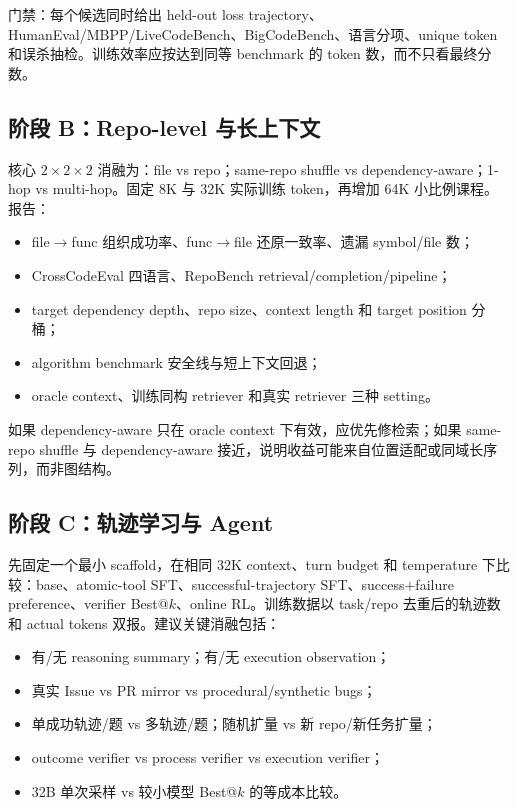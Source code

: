 \documentclass[10pt,a4paper,UTF8,fontset=none]{ctexart}
\begin{document}
门禁：每个候选同时给出 held-out loss trajectory、HumanEval/MBPP/LiveCodeBench、BigCodeBench、语言分项、unique token 和误杀抽检。训练效率应按达到同等 benchmark 的 token 数，而不只看最终分数。

\subsection{阶段 B：Repo-level 与长上下文}

核心 $2\times 2\times 2$ 消融为：file vs repo；same-repo shuffle vs dependency-aware；1-hop vs multi-hop。固定 8K 与 32K 实际训练 token，再增加 64K 小比例课程。报告：

\begin{itemize}
  \item file$\rightarrow$func 组织成功率、func$\rightarrow$file 还原一致率、遗漏 symbol/file 数；
  \item CrossCodeEval 四语言、RepoBench retrieval/completion/pipeline；
  \item target dependency depth、repo size、context length 和 target position 分桶；
  \item algorithm benchmark 安全线与短上下文回退；
  \item oracle context、训练同构 retriever 和真实 retriever 三种 setting。
\end{itemize}

如果 dependency-aware 只在 oracle context 下有效，应优先修检索；如果 same-repo shuffle 与 dependency-aware 接近，说明收益可能来自位置适配或同域长序列，而非图结构。

\subsection{阶段 C：轨迹学习与 Agent}

先固定一个最小 scaffold，在相同 32K context、turn budget 和 temperature 下比较：base、atomic-tool SFT、successful-trajectory SFT、success+failure preference、verifier Best@$k$、online RL。训练数据以 task/repo 去重后的轨迹数和 actual tokens 双报。建议关键消融包括：

\begin{itemize}
  \item 有/无 reasoning summary；有/无 execution observation；
  \item 真实 Issue vs PR mirror vs procedural/synthetic bugs；
  \item 单成功轨迹/题 vs 多轨迹/题；随机扩量 vs 新 repo/新任务扩量；
  \item outcome verifier vs process verifier vs execution verifier；
  \item 32B 单次采样 vs 较小模型 Best@$k$ 的等成本比较。
\end{itemize}
\end{document}
